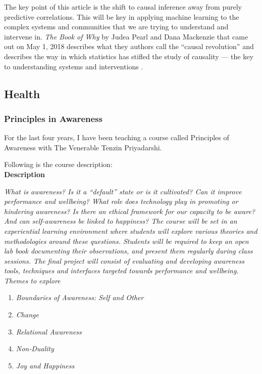 The key point of this article is the shift to causal inference away from purely predictive correlations. This will be key in applying machine learning to the complex systems and communities that we are trying to understand and intervene in. \textit{The Book of Why} by Judea Pearl and Dana Mackenzie that came out on May 1, 2018 describes what they authors call the ``causal revolution'' and describes the way in which statistics has stifled the study of causality --- the key to understanding systems and interventions \cite{TheBooko68:online}.

\subsection{Health}
\subsubsection{Principles in Awareness}
\label{section:awareness}

For the last four years, I have been teaching a course called Principles of Awareness with The Venerable Tenzin Priyadarshi.

Following is the course description: \\

\textbf{Description}

\textit{What is awareness? Is it a ``default'' state or is it cultivated? Can it improve performance and wellbeing? What role does technology play in promoting or hindering awareness? Is there an ethical framework for our capacity to be aware? And can self-awareness be linked to happiness? The course will be set in an experiential learning environment where students will explore various theories and methodologies around these questions. Students will be required to keep an open lab book documenting their observations, and present them regularly during class sessions. The final project will consist of evaluating and developing awareness tools, techniques and interfaces targeted towards performance and wellbeing.} \\

\textit{Themes to explore}
\begin{enumerate}
\item \textit{Boundaries of Awareness: Self and Other}
\item \textit{Change}
\item \textit{Relational Awareness}
\item \textit{Non-Duality}
\item \textit{Joy and Happiness}
\end{enumerate}

